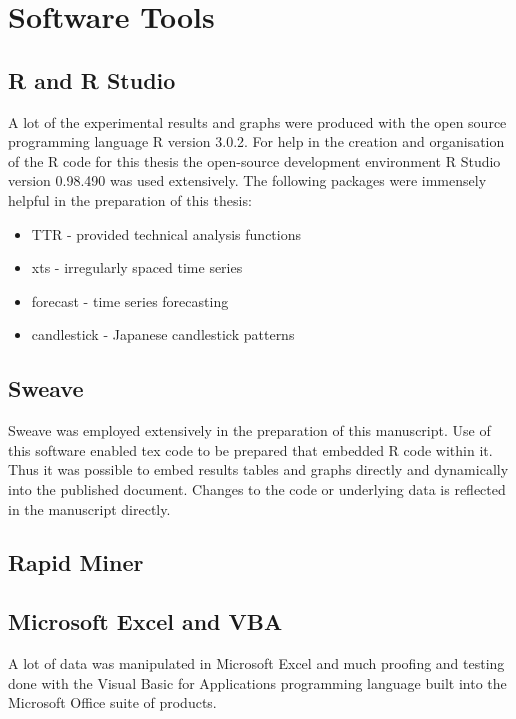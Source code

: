 \section{Software Tools}

\subsection{R and R Studio}
A lot of the experimental results and graphs were produced with the open source programming language R version 3.0.2. For help in the creation and organisation of the R code for this thesis the open-source development environment R Studio version 0.98.490 was used extensively. The following packages were immensely helpful in the preparation of this thesis:
\begin{itemize}
\item TTR - provided technical analysis functions
\item xts - irregularly spaced time series
\item forecast - time series forecasting
\item candlestick - Japanese candlestick patterns
\end{itemize}

\subsection{Sweave}
Sweave \citep{lmucs-papers:Leisch:2002} was employed extensively in the preparation of this manuscript. Use of this software enabled tex code to be prepared that embedded R code within it. Thus it was possible to embed results tables and graphs directly and dynamically into the published document. Changes to the code or underlying data is reflected in the manuscript directly.

\subsection{Rapid Miner}

\subsection{Microsoft Excel and VBA}
A lot of data was manipulated in Microsoft Excel and much proofing and testing done with the Visual Basic for Applications programming language built into the Microsoft Office suite of products.
